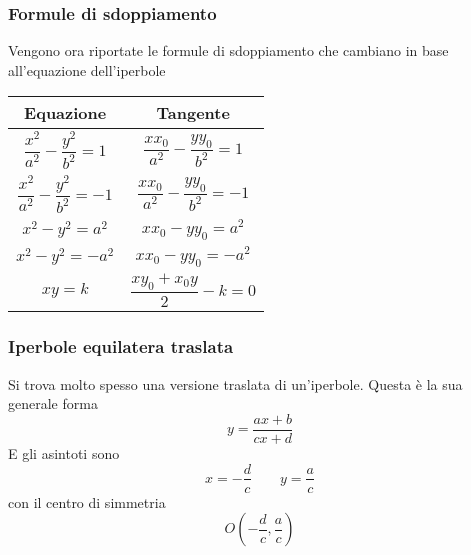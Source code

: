 \subsubsection{Formule di sdoppiamento}
Vengono ora riportate le formule di sdoppiamento che cambiano in base all'equazione dell'iperbole
\begin{center}
	\begin{tabular}{c|c}
		Equazione & Tangente\\\hline
		$\dfrac{x^2}{a^2}-\dfrac{y^2}{b^2}=1$ & $\dfrac{xx_0}{a^2}-\dfrac{yy_0}{b^2}=1$\\\hline
		$\dfrac{x^2}{a^2}-\dfrac{y^2}{b^2}=-1$ & $\dfrac{xx_0}{a^2}-\dfrac{yy_0}{b^2}=-1$\\\hline
		$x^2-y^2=a^2$ & $xx_0-yy_0=a^2$\\\hline
		$x^2-y^2=-a^2$ & $xx_0-yy_0=-a^2$\\\hline
		$xy=k$ & $\dfrac{xy_0+x_0y}{2}-k=0$
	\end{tabular}
\end{center}

\subsubsection{Iperbole equilatera traslata}
Si trova molto spesso una versione traslata di un'iperbole. Questa è la sua generale forma
\begin{equation*}
y=\frac{ax+b}{cx+d}
\end{equation*}
E gli asintoti sono
\begin{equation*}
x=-\frac{d}{c}\qquad y=\frac{a}{c}
\end{equation*}
con il centro di simmetria
\begin{equation*}
O\left(-\frac{d}{c},\frac{a}{c}\right)
\end{equation*}

